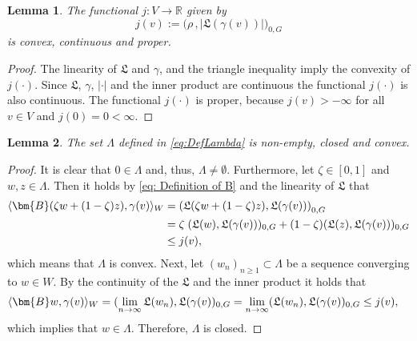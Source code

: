 \documentclass[12pt,twoside,reqno]{amsart}
\newtheorem{lemma}{Lemma}[section]
\theoremstyle{definition}
\numberwithin{equation}{section}
\renewcommand{\L}{\mathfrak{L}}
\newcommand{\B} {\bm{B}}
\newcommand  {\R}  {\mathbb R}
\begin{document}
\begin{lemma}\label{lem: j properties}
    The functional $j: V \to\R$ given by
    \begin{equation*}%
        j(v) := \bigl(\rho\,,|\mathfrak{L}(\gamma(v))|\bigr)_{0,G}
    \end{equation*}     
    is convex, continuous and proper.
\end{lemma}
%
\begin{proof}
    The linearity of $\L$ and $\gamma$, and the triangle inequality imply the convexity of $j(\cdot)$. Since $\L$, $\gamma$, $|\cdot|$ and the inner product are continuous the functional $j(\cdot)$ is also continuous. The functional $j(\cdot)$ is proper, because $j(v)>-\infty$ for all $v\in V$ and $j(0)=0<\infty$.
\end{proof}
%
\begin{lemma}\label{lem: Lambda properties}
    The set $\Lambda$ defined in \eqref{eq:DefLambda} is non-empty, closed and convex.
\end{lemma}
%
\begin{proof}
    It is clear that $0\in\Lambda$ and, thus, $\Lambda\neq\emptyset$. Furthermore, let $\zeta\in[0,1]$ and $w,z\in\Lambda$. Then it holds by \eqref{eq: Definition of B} and the linearity of $\L$ that
    \begin{equation*}
    \aligned
        \langle \B (\zeta w+(1-\zeta)z), \gamma(v)\rangle_W&=\left(\L(\zeta w+(1-\zeta)z),\L(\gamma(v))\right)_{0,G}\\
        &=\zeta\;(\L(w),\L(\gamma(v)))_{0,G}+(1-\zeta)(\L(z),\L(\gamma(v)))_{0,G}\\
        &\leq j(v),
    \endaligned
    \end{equation*}
    which means that $\Lambda$ is convex. Next, let $(w_n)_{n\geq1}\subset \Lambda$ be a sequence converging to $w\in W$. By the continuity of the $\L$ and the inner product it holds that
    \begin{equation*}
    \aligned
        \langle \B w, \gamma(v)\rangle_W &= (\lim\limits_{n\to\infty}\L(w_n),\L(\gamma(v))_{0,G}=\lim\limits_{n\to\infty}(\L(w_n),\L(\gamma(v))_{0,G}\leq j(v),
    \endaligned
    \end{equation*}
    which implies that $w\in \Lambda$. Therefore, $\Lambda$ is closed.
\end{proof}

\end{document}

